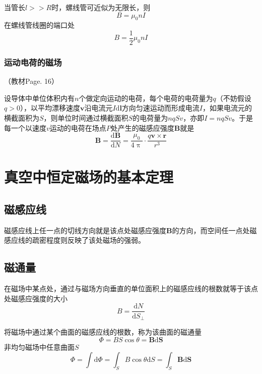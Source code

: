 \documentclass[12pt]{article}
\newcommand{\rmd}{\mathrm{d}}
\newcommand{\deriv}[2]{\frac{\rmd #1}{\rmd #2}}
\begin{document}
当管长\(l >> R\)时，螺线管可近似为无限长，则
\begin{equation}
    B = \mu_0 n I
\end{equation}
在螺线管线圈的端口处
\begin{equation}
    B = \frac{1}{2} \mu_0 n I
\end{equation}

\subsubsection{运动电荷的磁场}

（教材Page. 16）

设导体中单位体积内有\(n\)个做定向运动的电荷，每个电荷的电荷量为\(q\)（不妨假设\(q > 0\)），以平均漂移速度\(\boldsymbol{v}\)沿电流元\(I \rmd \boldsymbol{l}\)方向匀速运动而形成电流\(I\)，如果电流元的横截面积为\(S\)，则单位时间通过横截面积\(S\)的电荷量为\(nqSv\)，亦即\(I = nqSv\)。于是每一个以速度\(v\)运动的电荷在场点\(P\)处产生的磁感应强度\(\boldsymbol{B}\)就是
\begin{equation}
    \boldsymbol{B} = \deriv{\boldsymbol{B}}{N} = \frac{\mu_0}{4 \uppi} \cdot \frac{q \boldsymbol{v} \times \boldsymbol{r}}{r^3}
\end{equation}

\section{真空中恒定磁场的基本定理}

\subsection{磁感应线}

磁感应线上任一点的切线方向就是该点处磁感应强度\(\boldsymbol{B}\)的方向，而空间任一点处磁感应线的疏密程度则反映了该处磁场的强弱。

\subsection{磁通量}

在磁场中某点处，通过与磁场方向垂直的单位面积上的磁感应线的根数就等于该点处磁感应强度的大小
\begin{equation}
    B = \deriv{N}{S_{\perp}}
\end{equation}

将磁场中通过某个曲面的磁感应线的根数，称为该曲面的磁通量
\begin{equation}
    \Phi = BS \cos \theta = \boldsymbol{B} \rmd \boldsymbol{S}
\end{equation}
非均匀磁场中任意曲面\(S\)
\begin{equation}
    \Phi = \int \rmd \Phi = \int_S B \cos \theta \rmd S = \int_S \boldsymbol{B} \rmd \boldsymbol{S}
\end{equation}
\end{document}

